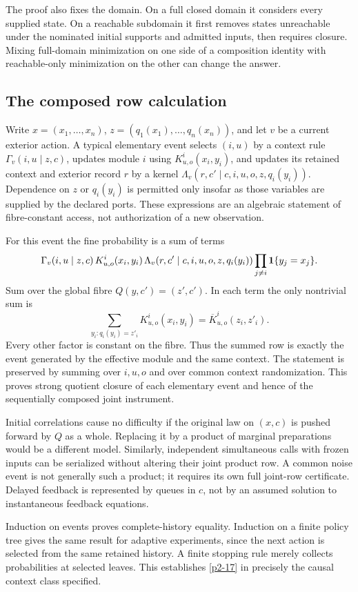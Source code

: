 The proof also fixes the domain. On a full closed domain it considers every supplied state. On a reachable subdomain it first removes states unreachable under the nominated initial supports and admitted inputs, then requires closure. Mixing full-domain minimization on one side of a composition identity with reachable-only minimization on the other can change the answer.

\subsection{The composed row calculation}
Write \(x=(x_1,\ldots,x_n)\), \(z=(q_1(x_1),\ldots,q_n(x_n))\), and let \(v\) be a current exterior action. A typical elementary event selects \((i,u)\) by a context rule \(\Gamma_v(i,u\mid z,c)\), updates module \(i\) using \(K^i_{u,o}(x_i,y_i)\), and updates its retained context and exterior record \(r\) by a kernel \(\Lambda_v(r,c'\mid c,i,u,o,z,q_i(y_i))\). Dependence on \(z\) or \(q_i(y_i)\) is permitted only insofar as those variables are supplied by the declared ports. These expressions are an algebraic statement of fibre-constant access, not authorization of a new observation.

For this event the fine probability is a sum of terms
\[
 \Gamma_v(i,u\mid z,c)\,
 K^i_{u,o}(x_i,y_i)\,
 \Lambda_v(r,c'\mid c,i,u,o,z,q_i(y_i))
 \prod_{j\ne i}\mathbf 1\{y_j=x_j\}.
\]
Sum over the global fibre \(Q(y,c')=(z',c')\). In each term the only nontrivial sum is
\[
 \sum_{y_i:q_i(y_i)=z'_i}K^i_{u,o}(x_i,y_i)
 =\overline K^i_{u,o}(z_i,z'_i).
\]
Every other factor is constant on the fibre. Thus the summed row is exactly the event generated by the effective module and the same context. The statement is preserved by summing over \(i,u,o\) and over common context randomization. This proves strong quotient closure of each elementary event and hence of the sequentially composed joint instrument.

Initial correlations cause no difficulty if the original law on \((x,c)\) is pushed forward by \(Q\) as a whole. Replacing it by a product of marginal preparations would be a different model. Similarly, independent simultaneous calls with frozen inputs can be serialized without altering their joint product row. A common noise event is not generally such a product; it requires its own full joint-row certificate. Delayed feedback is represented by queues in \(c\), not by an assumed solution to instantaneous feedback equations.

Induction on events proves complete-history equality. Induction on a finite policy tree gives the same result for adaptive experiments, since the next action is selected from the same retained history. A finite stopping rule merely collects probabilities at selected leaves. This establishes \cref{p2-17} in precisely the causal context class specified.

